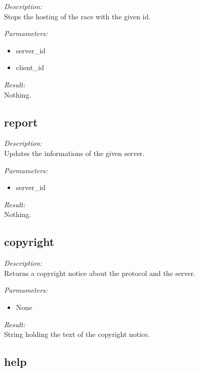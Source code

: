 \begin{description}
\item {\it Description:}\\
Stops the hosting of the race with the given id.
\item {\it Parmameters:}
\begin{itemize}
\item server\_id
\item client\_id
\end{itemize}
\item {\it Result:}\\
Nothing.
\end{description}

\subsection{report}

\begin{description}
\item {\it Description:}\\
Updates the informations of the given server.
\item {\it Parmameters:}
\begin{itemize}
\item server\_id
\end{itemize}
\item {\it Result:}\\
Nothing.
\end{description}

\subsection{copyright}

\begin{description}
\item {\it Description:}\\
Returns a copyright notice about the protocol and the server.
\item {\it Parmameters:}
\begin{itemize}
\item None
\end{itemize}
\item {\it Result:}\\
String holding the text of the copyright notice.
\end{description}

\subsection{help}

